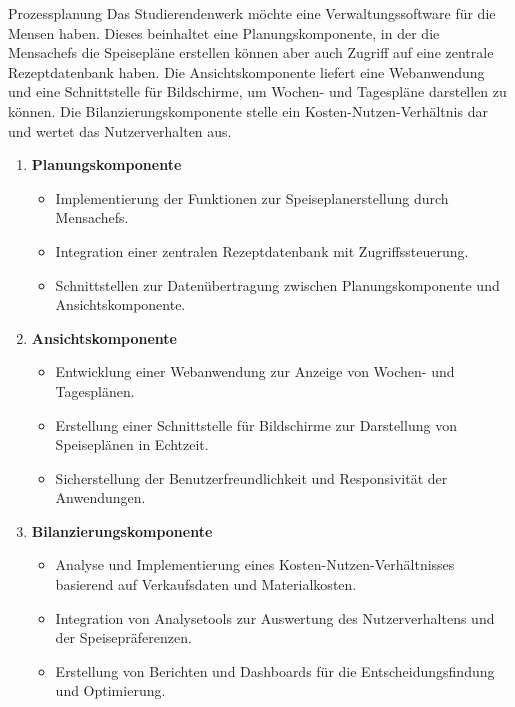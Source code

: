 \documentclass{article}
\begin{document}
\begin{exercise}{Prozessplanung}
  Das Studierendenwerk möchte eine Verwaltungssoftware für die Mensen haben. Dieses beinhaltet eine Planungskomponente, in der die Mensachefs die Speisepläne erstellen können aber auch Zugriff auf eine zentrale Rezeptdatenbank haben. Die Ansichtskomponente liefert eine Webanwendung und eine Schnittstelle für Bildschirme, um Wochen- und Tagespläne darstellen zu können. Die Bilanzierungskomponente stelle ein Kosten-Nutzen-Verhältnis dar und wertet das Nutzerverhalten aus.


  \begin{enumerate}
    \item \textbf{Planungskomponente}
          \begin{itemize}
            \item Implementierung der Funktionen zur Speiseplanerstellung durch Mensachefs.
            \item Integration einer zentralen Rezeptdatenbank mit Zugriffssteuerung.
            \item Schnittstellen zur Datenübertragung zwischen Planungskomponente und Ansichtskomponente.
          \end{itemize}

    \item \textbf{Ansichtskomponente}
          \begin{itemize}
            \item Entwicklung einer Webanwendung zur Anzeige von Wochen- und Tagesplänen.
            \item Erstellung einer Schnittstelle für Bildschirme zur Darstellung von Speiseplänen in Echtzeit.
            \item Sicherstellung der Benutzerfreundlichkeit und Responsivität der Anwendungen.
          \end{itemize}

    \item \textbf{Bilanzierungskomponente}
          \begin{itemize}
            \item Analyse und Implementierung eines Kosten-Nutzen-Verhältnisses basierend auf Verkaufsdaten und Materialkosten.
            \item Integration von Analysetools zur Auswertung des Nutzerverhaltens und der Speisepräferenzen.
            \item Erstellung von Berichten und Dashboards für die Entscheidungsfindung und Optimierung.
          \end{itemize}
  \end{enumerate}


\end{exercise}
\end{document}
